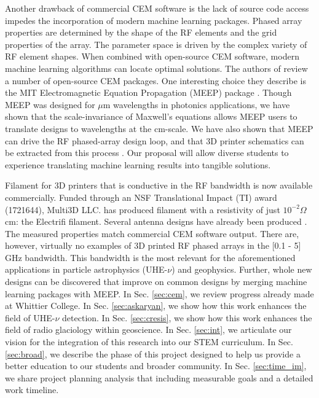 \documentclass[10pt]{amsart}
\theoremstyle{definition}
\numberwithin{equation}{section}
\begin{document}
Another drawback of commercial CEM software is the lack of source code access impedes the incorporation of modern machine learning packages.  Phased array properties are determined by the shape of the RF elements and the grid properties of the array.  The parameter space is driven by the complex variety of RF element shapes.  When combined with open-source CEM software, modern machine learning algorithms can locate optimal solutions.  The authors of \cite{10.3390/electronics8121506} review a number of open-source CEM packages.  One interesting choice they describe is the MIT Electromagnetic Equation Propagation (MEEP) package \cite{10.1016/j.cpc.2009.11.008}.  Though MEEP was designed for $\mu$m wavelengths in photonics applications, we have shown that the scale-invariance of Maxwell's equations allows MEEP users to translate designs to wavelengths at the cm-scale.  We have also shown that MEEP can drive the RF phased-array design loop, and that 3D printer schematics can be extracted from this process \cite{electronics10040415,meepcon2022,10.1016/j.cpc.2009.11.008}.  Our proposal will allow diverse students to experience translating machine learning results into tangible solutions.  

Filament for 3D printers that is conductive in the RF bandwidth is now available commercially.  Funded through an NSF Translational Impact (TI) award (1721644), Multi3D LLC. has produced filament with a resistivity of just $10^{-2} \Omega$ cm: the Electrifi filament.  Several antenna designs have already been produced \cite{8786183,10.1049/iet-map.2017.0104}.  The measured properties match commercial CEM software output.  There are, however, virtually no examples of 3D printed RF phased arrays in the [0.1 - 5] GHz bandwidth.  This bandwidth is the most relevant for the aforementioned applications in particle astrophysics (UHE-$\nu$) and geophysics.  Further, whole new designs can be discovered that improve on common designs by merging machine learning packages with MEEP.  In Sec. \ref{sec:cem}, we review progress already made at Whittier College.  In Sec. \ref{sec:askaryan}, we show how this work enhances the field of UHE-$\nu$ detection.  In Sec. \ref{sec:cresis}, we show how this work enhances the field of radio glaciology within geoscience.  In Sec. \ref{sec:int}, we articulate our vision for the integration of this research into our STEM curriculum.  In Sec. \ref{sec:broad}, we describe the phase of this project designed to help us provide a better education to our students and broader community.  In Sec. \ref{sec:time_im}, we share project planning analysis that including measurable goals and a detailed work timeline.
\end{document}
